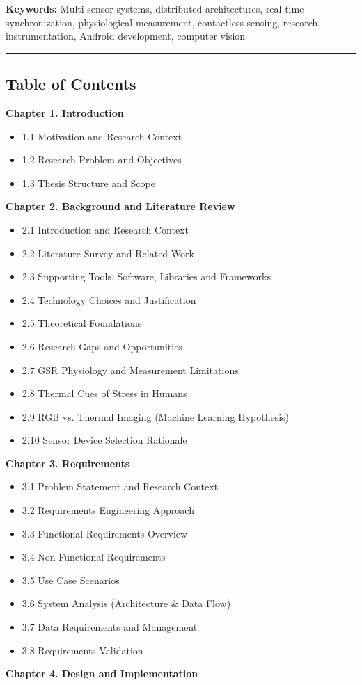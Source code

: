 \documentclass[12pt,a4paper]{report}
\begin{document}
\textbf{Keywords:} Multi-sensor systems, distributed architectures, real-time synchronization, physiological measurement,
contactless sensing, research instrumentation, Android development, computer vision

\hrule

\subsection{Table of Contents}

\textbf{Chapter 1. Introduction}

\begin{itemize}
\item 1.1 Motivation and Research Context
\item 1.2 Research Problem and Objectives
\item 1.3 Thesis Structure and Scope

\end{itemize}
\textbf{Chapter 2. Background and Literature Review}

\begin{itemize}
\item 2.1 Introduction and Research Context
\item 2.2 Literature Survey and Related Work
\item 2.3 Supporting Tools, Software, Libraries and Frameworks
\item 2.4 Technology Choices and Justification
\item 2.5 Theoretical Foundations
\item 2.6 Research Gaps and Opportunities
\item 2.7 GSR Physiology and Measurement Limitations
\item 2.8 Thermal Cues of Stress in Humans
\item 2.9 RGB vs. Thermal Imaging (Machine Learning Hypothesis)
\item 2.10 Sensor Device Selection Rationale

\end{itemize}
\textbf{Chapter 3. Requirements}

\begin{itemize}
\item 3.1 Problem Statement and Research Context
\item 3.2 Requirements Engineering Approach
\item 3.3 Functional Requirements Overview
\item 3.4 Non-Functional Requirements
\item 3.5 Use Case Scenarios
\item 3.6 System Analysis (Architecture & Data Flow)
\item 3.7 Data Requirements and Management
\item 3.8 Requirements Validation

\end{itemize}
\textbf{Chapter 4. Design and Implementation}
\end{document}
